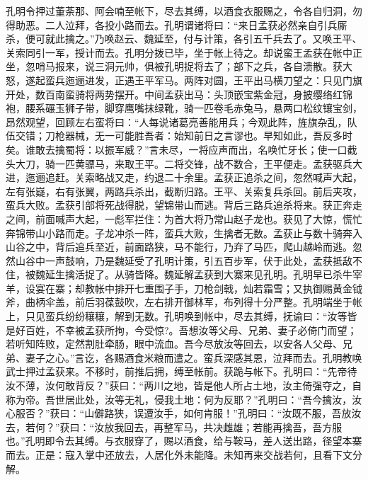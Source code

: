 孔明令押过董荼那、阿会喃至帐下，尽去其缚，以酒食衣服赐之，令各自归洞，勿得助恶。二人泣拜，各投小路而去。孔明谓诸将曰：“来日孟获必然亲自引兵厮杀，便可就此擒之。”乃唤赵云、魏延至，付与计策，各引五千兵去了。又唤王平、关索同引一军，授计而去。孔明分拨已毕，坐于帐上待之。却说蛮王孟获在帐中正坐，忽哨马报来，说三洞元帅，俱被孔明捉将去了；部下之兵，各自溃散。获大怒，遂起蛮兵迤逦进发，正遇王平军马。两阵对圆，王平出马横刀望之：只见门旗开处，数百南蛮骑将两势摆开。中间孟获出马：头顶嵌宝紫金冠，身披缨络红锦袍，腰系碾玉狮子带，脚穿鹰嘴抹绿靴，骑一匹卷毛赤兔马，悬两口松纹镶宝剑，昂然观望，回顾左右蛮将曰：“人每说诸葛亮善能用兵；今观此阵，旌旗杂乱，队伍交错；刀枪器械，无一可能胜吾者：始知前日之言谬也。早知如此，吾反多时矣。谁敢去擒蜀将：以振军威？”言未尽，一将应声而出，名唤忙牙长；使一口截头大刀，骑一匹黄骠马，来取王平。二将交锋，战不数合，王平便走。孟获驱兵大进，迤逦追赶。关索略战又走，约退二十余里。孟获正追杀之间，忽然喊声大起，左有张嶷，右有张翼，两路兵杀出，截断归路。王平、关索复兵杀回。前后夹攻，蛮兵大败。孟获引部将死战得脱，望锦带山而逃。背后三路兵追杀将来。获正奔走之间，前面喊声大起，一彪军拦住：为首大将乃常山赵子龙也。获见了大惊，慌忙奔锦带山小路而走。子龙冲杀一阵，蛮兵大败，生擒者无数。孟获止与数十骑奔入山谷之中，背后追兵至近，前面路狭，马不能行，乃弃了马匹，爬山越岭而逃。忽然山谷中一声鼓响，乃是魏延受了孔明计策，引五百步军，伏于此处，孟获抵敌不住，被魏延生擒活捉了。从骑皆降。魏延解孟获到大寨来见孔明。孔明早已杀牛宰羊，设宴在寨；却教帐中排开七重围子手，刀枪剑戟，灿若霜雪；又执御赐黄金钺斧，曲柄伞盖，前后羽葆鼓吹，左右排开御林军，布列得十分严整。孔明端坐于帐上，只见蛮兵纷纷穰穰，解到无数。孔明唤到帐中，尽去其缚，抚谕曰：“汝等皆是好百姓，不幸被孟获所拘，今受惊?。吾想汝等父母、兄弟、妻子必倚门而望；若听知阵败，定然割肚牵肠，眼中流血。吾今尽放汝等回去，以安各人父母、兄弟、妻子之心。”言讫，各赐酒食米粮而遣之。蛮兵深感其恩，泣拜而去。孔明教唤武士押过孟获来。不移时，前推后拥，缚至帐前。获跪与帐下。孔明曰：“先帝待汝不薄，汝何敢背反？”获曰：“两川之地，皆是他人所占土地，汝主倚强夺之，自称为帝。吾世居此处，汝等无礼，侵我土地：何为反耶？”孔明曰：“吾今擒汝，汝心服否？”获曰：“山僻路狭，误遭汝手，如何肯服！”孔明曰：“汝既不服，吾放汝去，若何？”获曰：“汝放我回去，再整军马，共决雌雄；若能再擒吾，吾方服也。”孔明即令去其缚。与衣服穿了，赐以酒食，给与鞍马，差人送出路，径望本寨而去。正是：寇入掌中还放去，人居化外未能降。未知再来交战若何，且看下文分解。